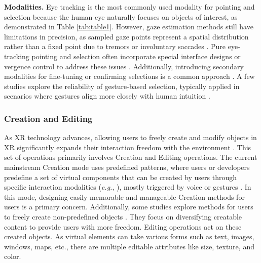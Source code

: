 \documentclass[review]{fcs}
\begin{document}
\textbf{Modalities.} Eye tracking is the most commonly used modality for pointing and selection because the human eye naturally focuses on objects of interest, as demonstrated in Table \ref{tab:table1}. However, gaze estimation methods still have limitations in precision, as sampled gaze points represent a spatial distribution rather than a fixed point due to  tremors or
involuntary saccades \cite{DBLP:conf/chi/SidenmarkCNLPG23}. Pure eye-tracking pointing and selection often incorporate special interface designs or vergence control to address these issues \cite{DBLP:conf/chi/SidenmarkCNLPG23,DBLP:conf/ismar/LeeHM22,DBLP:conf/chi/WeiSYW0YL23,DBLP:conf/vr/OrloskyLSSM24,DBLP:conf/chi/ZhangCSS24,DBLP:conf/chi/ChoiSO22,kim2022lattice,DBLP:conf/vr/0001LC00S22,DBLP:journals/tvcg/WangZ022}. Additionally, introducing secondary modalities for fine-tuning or confirming selections is a common approach \cite{DBLP:journals/tvcg/SidenmarkP0CGWG22,10.1145/3544548.3581423,DBLP:conf/chi/HouNSKBG23,10.1145/3591129,10.1145/3530886}. A few studies explore the reliability of gesture-based selection, typically applied in scenarios where gestures align more closely with human intuition \cite{DBLP:conf/vr/QuereMJWW24,DBLP:conf/chi/SchmitzGS022,DBLP:journals/tvcg/SongDK23}.


\subsubsection{Creation and Editing}
As XR technology advances, allowing users to freely create and modify objects in XR significantly expands their interaction freedom with the environment \cite{DBLP:conf/chi/TorreFHBFL24}. This set of operations primarily involves Creation and Editing operations. The current mainstream Creation mode uses predefined patterns, where users or developers predefine a set of virtual components that can be created by users through specific interaction modalities (\textit{e.g.}, \cite{DBLP:conf/uist/LiaoKJKS22,DBLP:conf/chi/CaoKWAX24,DBLP:conf/vr/QuereMJWW24}), mostly triggered by voice \cite{DBLP:conf/uist/LiaoKJKS22} or gestures \cite{DBLP:conf/chi/CaoKWAX24}. In this mode, designing easily memorable and manageable Creation methods for users is a primary concern\cite{DBLP:conf/chi/PeiCLZ22,DBLP:conf/ismar/ChenGFCL23}. Additionally, some studies explore methods for users to freely create non-predefined objects \cite{DBLP:journals/tvcg/XuZSFY23,DBLP:conf/vr/GiunchiNGS24,DBLP:journals/tvcg/SongDK23,DBLP:conf/chi/PeiCLZ22}. They focus on diversifying creatable content to provide users with more freedom. Editing operations act on these created objects. As virtual elements can take various forms such as text, images, windows, maps, etc., there are multiple editable attributes like size, texture, and color\cite{DBLP:conf/chi/WangYWJ024}.
\end{document}
